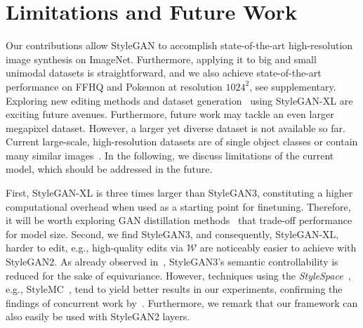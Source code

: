 \section{Limitations and Future Work}
\label{sec:limitations}
Our contributions allow StyleGAN to accomplish state-of-the-art high-resolution image synthesis on ImageNet.  
Furthermore, applying it to big and small unimodal datasets is straightforward, and we also achieve state-of-the-art performance on FFHQ and Pokemon at resolution $1024^2$, see supplementary.
Exploring new editing methods and dataset generation~\cite{Chai2021CVPR,Li2022ARXIV} using StyleGAN-XL are exciting future avenues. Furthermore, future work may tackle an even larger megapixel dataset. However, a larger yet diverse dataset is not available so far. Current large-scale, high-resolution datasets are of single object classes or contain many similar images~\cite{Zhang2020ECCV,Fregin2018ICRA,Perot2020NEURIPS}. In the following, we discuss limitations of the current model, which should be addressed in the future.

First, StyleGAN-XL is three times larger than StyleGAN3, constituting a higher computational overhead when used as a starting point for finetuning. Therefore, it will be worth exploring GAN distillation methods~\cite{Chang2020ACCV} that trade-off performance for model size. 
Second, we find StyleGAN3, and consequently, StyleGAN-XL, harder to edit, e.g., high-quality edits via $\mathcal{W}$ are noticeably easier to achieve with StyleGAN2. As already observed in~\cite{Karras2021NEURIPS}, StyleGAN3's semantic controllability is reduced for the sake of equivariance. 
However, techniques using the \textit{StyleSpace}~\cite{WU2021CVPRa}, e.g., StyleMC~\cite{Kocasari2021WACV}, tend to yield better results in our experiments, confirming the findings of concurrent work by~\cite{Alaluf2022ARXIV}. Furthermore, we remark that our framework can also easily be used with StyleGAN2 layers.

